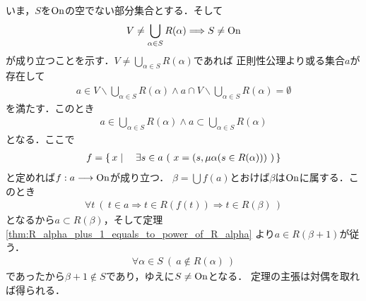 	\begin{prf}
		いま，$S$を$\mathrm{On}$の空でない部分集合とする．そして
		\begin{align}
			V \neq \bigcup_{\alpha \in S} R(\alpha)
			\Longrightarrow S \neq \mathrm{On}
		\end{align}
		が成り立つことを示す．$V \neq \bigcup_{\alpha \in S} R(\alpha)$であれば
		正則性公理より或る集合$a$が存在して
		\begin{align}
			a \in V \backslash \bigcup_{\alpha \in S} R(\alpha)
			\wedge a \cap V \backslash \bigcup_{\alpha \in S} R(\alpha) = \emptyset
		\end{align}
		を満たす．このとき
		\begin{align}
			a \in \bigcup_{\alpha \in S} R(\alpha) \wedge a \subset \bigcup_{\alpha \in S} R(\alpha)
		\end{align}
		となる．ここで
		\begin{align}
			f = \left\{\, x \mid \quad \exists s \in a\ (\ x = (s,\mu \alpha (s \in R(\alpha)))\ )\, \right\}
		\end{align}
		と定めれば$f:a \longrightarrow \mathrm{On}$が成り立つ．
		$\beta = \bigcup f(a)$とおけば$\beta$は$\mathrm{On}$に属する．このとき
		\begin{align}
			\forall t\ (\ t \in a \Longrightarrow t \in R(f(t))
			\Longrightarrow t \in R(\beta)\ )
		\end{align}
		となるから$a \subset R(\beta)$，そして定理\ref{thm:R_alpha_plus_1_equals_to_power_of_R_alpha}
		より$a \in R(\beta + 1)$が従う．
		\begin{align}
			\forall \alpha \in S\ (\ a \notin R(\alpha)\ )
		\end{align}
		であったから$\beta + 1 \notin S$であり，ゆえに$S \neq \mathrm{On}$となる．
		定理の主張は対偶を取れば得られる．
		\QED
	\end{prf}
	
	
